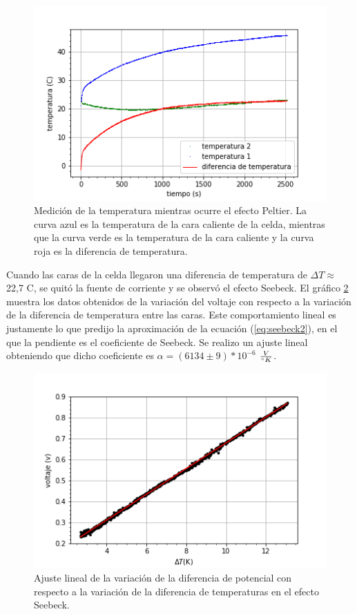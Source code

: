 \documentclass[twoside,twocolumn,a4paper]{article}
\begin{document}
\begin{figure}[H]
\includegraphics[width=\linewidth]{peltier_temps_C.png}
\caption{Medici\'on de la temperatura mientras ocurre el efecto Peltier. La curva azul es la temperatura de la cara caliente de la celda, mientras que la curva verde es la temperatura de la cara caliente y la curva roja es la diferencia de temperatura.}
\label{fig:temps_C}
\end{figure}


Cuando las caras de la celda llegaron una diferencia de temperatura de $\Delta T \approx$  22,7 \degree C, se quit\'o la fuente de corriente y se observ\'o el efecto Seebeck. El gr\'afico \ref{fig:seebeck} muestra los datos obtenidos de la variaci\'on del voltaje con respecto a la variaci\'on de la diferencia de temperatura entre las caras. Este comportamiento lineal es justamente lo que predijo la aproximaci\'on de la ecuaci\'on (\ref{eq:seebeck2}), en el que la pendiente es el coeficiente de Seebeck. Se realizo un ajuste lineal obteniendo que dicho coeficiente es $\alpha = (6134 \pm 9) * 10^{-6}$ $\frac{V}{\degree K}$.


\begin{figure}[H]
\includegraphics[width=\linewidth]{seebeck_ajuste.png}
\caption{Ajuste lineal de la variaci\'on de la diferencia de potencial con respecto a la variaci\'on de la diferencia de temperaturas en el efecto Seebeck.}
\label{fig:seebeck}
\end{figure}
\end{document}
